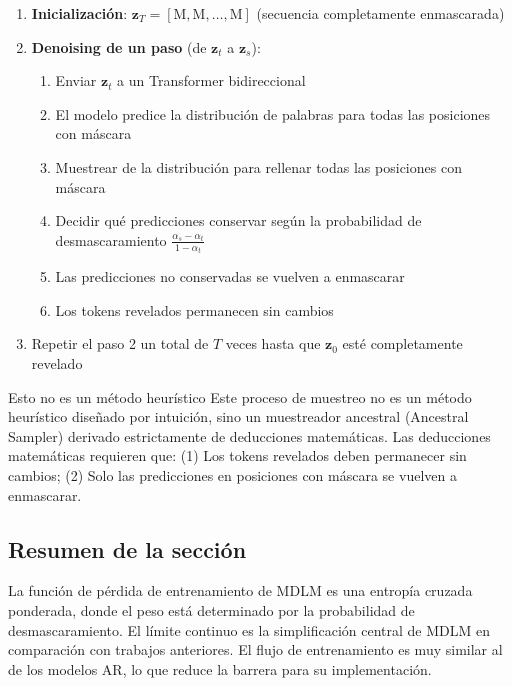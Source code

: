 \begin{enumerate}
    \item \textbf{Inicialización}: $\mathbf{z}_T = [\text{M}, \text{M}, \ldots, \text{M}]$ (secuencia completamente enmascarada)
    \item \textbf{Denoising de un paso} (de $\mathbf{z}_t$ a $\mathbf{z}_s$):
    \begin{enumerate}
        \item Enviar $\mathbf{z}_t$ a un Transformer bidireccional
        \item El modelo predice la distribución de palabras para todas las posiciones con máscara
        \item Muestrear de la distribución para rellenar todas las posiciones con máscara
        \item Decidir qué predicciones conservar según la probabilidad de desmascaramiento $\frac{\alpha_s - \alpha_t}{1 - \alpha_t}$
        \item Las predicciones no conservadas se vuelven a enmascarar
        \item Los tokens revelados permanecen sin cambios
    \end{enumerate}
    \item Repetir el paso 2 un total de $T$ veces hasta que $\mathbf{z}_0$ esté completamente revelado
\end{enumerate}

\begin{warningbox}{Esto no es un método heurístico}
Este proceso de muestreo no es un método heurístico diseñado por intuición, sino un muestreador ancestral (Ancestral Sampler) derivado estrictamente de deducciones matemáticas. Las deducciones matemáticas requieren que: (1) Los tokens revelados deben permanecer sin cambios; (2) Solo las predicciones en posiciones con máscara se vuelven a enmascarar.
\end{warningbox}

\subsection{Resumen de la sección}

La función de pérdida de entrenamiento de MDLM es una entropía cruzada ponderada, donde el peso está determinado por la probabilidad de desmascaramiento. El límite continuo es la simplificación central de MDLM en comparación con trabajos anteriores. El flujo de entrenamiento es muy similar al de los modelos AR, lo que reduce la barrera para su implementación.

\newpage
